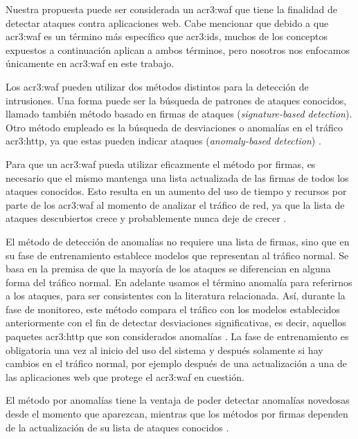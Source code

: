 Nuestra propuesta puede ser considerada un \gls{acr3:waf} que tiene la
finalidad de detectar ataques contra aplicaciones web.
Cabe mencionar que debido a que \gls{acr3:waf} es un término más específico
que \gls{acr3:ids}, muchos de los conceptos expuestos a continuación aplican
a ambos términos, pero nosotros nos enfocamos únicamente en \gls{acr3:waf}
en este trabajo.
\bigskip

Los \gls{acr3:waf} pueden utilizar dos métodos distintos para la detección
de intrusiones.
Una forma puede ser la búsqueda de patrones de ataques conocidos, llamado
también método basado en firmas de ataques (\textit{signature-based
detection}).
Otro método empleado es la búsqueda de desviaciones o anomalías en el
tráfico \gls{acr3:http}, ya que estas pueden indicar ataques
(\textit{anomaly-based detection}) \cite{torranoGimenez2015study}.

Para que un \gls{acr3:waf} pueda utilizar eficazmente el método por firmas,
es necesario que el mismo mantenga una lista actualizada de las firmas de
todos los ataques conocidos. Esto resulta en un aumento del uso de tiempo y
recursos por parte de los \gls{acr3:waf} al momento de analizar el tráfico
de red, ya que la lista de ataques descubiertos crece y probablemente
nunca deje de crecer \cite{kruegel2003anomaly}.

El método de detección de anomalías no requiere una lista de firmas,
sino que en su fase de entrenamiento establece modelos que representan al
tráfico normal. Se basa en la premisa de que la mayoría de los ataques se
diferencian en alguna forma del tráfico normal.
En adelante usamos el término anomalía para referirnos a los ataques,
para ser consistentes con la literatura relacionada.
Así, durante la fase de monitoreo, este método compara el tráfico con los
modelos establecidos anteriormente con el fin de detectar desviaciones
significativas, es decir, aquellos paquetes \gls{acr3:http} que son
considerados anomalías \cite{kruegel2003anomaly}.
La fase de entrenamiento es obligatoria una vez al inicio del uso del
sistema y después solamente si hay cambios en el tráfico normal, por ejemplo
después de una actualización a una de las aplicaciones web que protege el
\gls{acr3:waf} en cuestión.

El método por anomalías tiene la ventaja de poder detectar anomalías
novedosas desde el momento que aparezcan, mientras que los métodos por
firmas dependen de la actualización de su lista de ataques conocidos
\cite{kruegel2003anomaly}.


